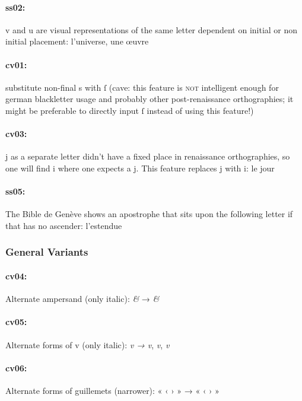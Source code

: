 \documentclass[pagesize,DIV14]{scrartcl}
\begin{document}
\paragraph{ss02:} v and u are visual representations of the same letter dependent on initial or non initial placement: {l’universe, une œuvre}
\paragraph*{cv01:} {substitute non-final s with ſ} (cave: this feature is \textsc{not} intelligent enough for german blackletter usage and probably other post-renaissance orthographies; it might be preferable to directly input ſ instead of using this feature!)
\paragraph*{cv03:} j as a separate letter didn’t have a fixed place  in renaissance orthographies, so one will find i where one expects a j. This feature replaces j with i: {le jour}
\paragraph*{ss05:} The Bible de Genève shows an apostrophe that sits upon the following letter if that has no ascender: {l’estendue}

\subsubsection{General Variants}

\paragraph*{cv04:} Alternate ampersand (only italic): \textit{\&} → \textit{\&}

\paragraph*{cv05:} Alternate forms of v (only italic): 
\textit{v → {v}}, \textit{v}, \textit{v}

\paragraph*{cv06:} Alternate forms of guillemets (narrower): « ‹ › » → {« ‹ › »}
\end{document}

